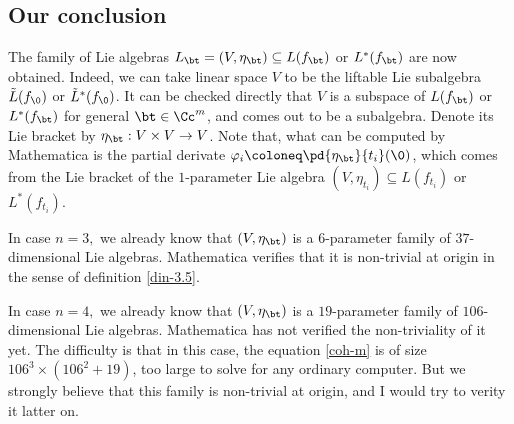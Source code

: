 \subsection{Our conclusion} 
The family of Lie algebras $L_\bt = (V, \eta_\bt)\subseteq L(f_\bt)$ or $L^*(f_\bt)$ are now obtained. Indeed, we can take linear space $V$ to be the liftable Lie subalgebra $\tilde L(f_\0)$ or $\tilde L^*(f_\0)$. It can be checked directly that $V$ is a subspace of $L(f_\bt)$ or $L^*(f_\bt)$ for general $\bt\in \Cc^m$, and comes out to be a subalgebra. Denote its Lie bracket by $\eta_{\bt}: V\times V \to V$. Note that, what can be computed by Mathematica is the partial derivate $\varphi_i\coloneq \pd{\eta_{\bt}}{t_i}(\0)$, which comes from the Lie bracket of the $1$-parameter Lie algebra $(V,\eta_{t_i})\subseteq L(f_{t_i})$ or $L^*(f_{t_i})$.

In case $n=3,$ we already know that $(V,\eta_{\bt})$ is a $6$-parameter family of  $37$-dimensional Lie algebras. Mathematica verifies that it is non-trivial at origin in the sense of definition \ref{din-3.5}.

In case $n=4,$ we already know that $(V,\eta_{\bt})$ is a $19$-parameter family of  $106$-dimensional Lie algebras. Mathematica has not verified the non-triviality of it yet. The difficulty is that in this case, the equation \eqref{coh-m} is of size $106^3\times ( 106^2 +19)$, too large to solve for any ordinary computer. But we strongly believe that this family is non-trivial at origin, and I would try to verity it latter on.
